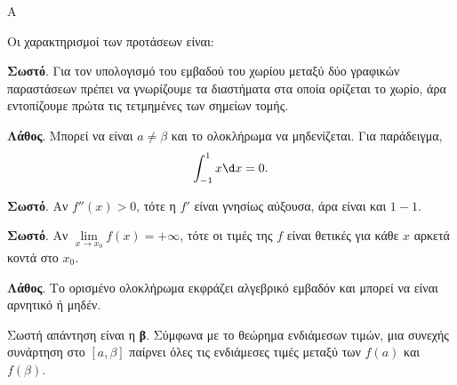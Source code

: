 \begin{thema}{Α}
\begin{erwthma}
\item {}

\item {}

\item {}

\item Οι χαρακτηρισμοί των προτάσεων είναι:
\begin{alist}
\item \textbf{Σωστό}. Για τον υπολογισμό του εμβαδού του χωρίου μεταξύ δύο γραφικών παραστάσεων πρέπει να γνωρίζουμε τα διαστήματα στα οποία ορίζεται το χωρίο, άρα εντοπίζουμε πρώτα τις τετμημένες των σημείων τομής.
\item \textbf{Λάθος}. Μπορεί να είναι $a\neq\beta$ και το ολοκλήρωμα να μηδενίζεται. Για παράδειγμα,
\[ \dint_{-1}^{1}x\d x=0. \]
\item \textbf{Σωστό}. Αν $f''(x)>0$, τότε η $f'$ είναι γνησίως αύξουσα, άρα είναι και $1-1$.
\item \textbf{Σωστό}. Αν $\lim\limits_{x\to x_0}f(x)=+\infty$, τότε οι τιμές της $f$ είναι θετικές για κάθε $x$ αρκετά κοντά στο $x_0$.
\item \textbf{Λάθος}. Το ορισμένο ολοκλήρωμα εκφράζει αλγεβρικό εμβαδόν και μπορεί να είναι αρνητικό ή μηδέν.
\end{alist}

\item Σωστή απάντηση είναι η \textbf{β}. Σύμφωνα με το θεώρημα ενδιάμεσων τιμών, μια συνεχής συνάρτηση στο $[a,\beta]$ παίρνει όλες τις ενδιάμεσες τιμές μεταξύ των $f(a)$ και $f(\beta)$.
\end{erwthma}
\end{thema}

